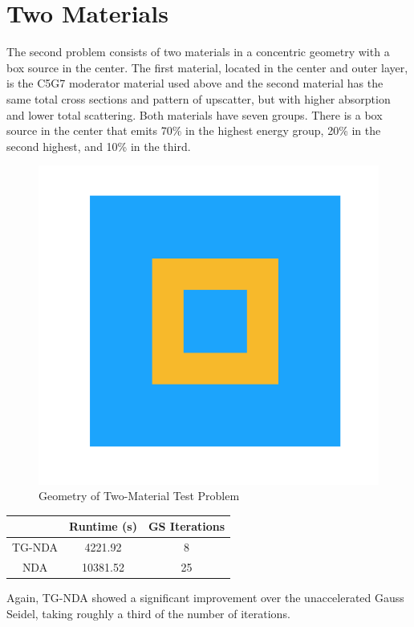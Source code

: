 \section{Two Materials}
The second problem consists of two materials in a concentric geometry with a box source in the center. The first material, located in the center and outer layer, is the C5G7 moderator material used above and the second material has the same total cross sections and pattern of upscatter, but with higher absorption and lower total scattering. Both materials have seven groups. There is a box source in the center that emits 70\% in the highest energy group, 20\% in the second highest, and 10\% in the third.
\begin{figure}
    \centering
    \includegraphics[width=.3\textwidth]{fig/Geometry.png}
    \caption{Geometry of Two-Material Test Problem}
    \label{fig:test_geometry}
\end{figure}

\begin{center}
    \begin{tabular}{|c|c|c|}
    \hline
    & Runtime (s) & GS Iterations \\
    \hline
    TG-NDA & 4221.92 & 8 \\
    NDA & 10381.52 & 25 \\
    \hline
    \end{tabular}
\end{center}

Again, TG-NDA showed a significant improvement over the unaccelerated Gauss Seidel, taking roughly a third of the number of iterations. 